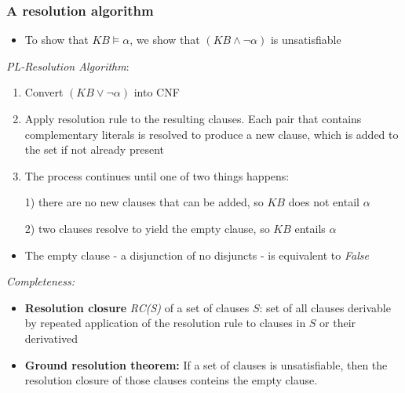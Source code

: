 \documentclass{scrartcl}
\begin{document}
\subsubsection{A resolution algorithm}
\begin{itemize}
    \item
        To show that $KB \vDash \alpha$, we show that $(KB \land \lnot \alpha)$ is unsatisfiable
\end{itemize}
\textit{PL-Resolution Algorithm}:
\begin{enumerate}
    \item
        Convert $(KB \lor \lnot \alpha)$ into CNF
    \item
        Apply resolution rule to the resulting clauses. Each pair that contains complementary literals is resolved to produce a new clause, which is added to the set if not already present
    \item
        The process continues until one of two things happens:

        1) there are no new clauses that can be added, so $KB$ does not entail $\alpha$
        
        2) two clauses resolve to yield the empty clause, so $KB$ entails $\alpha$
\end{enumerate}
\begin{itemize}
    \item
        The empty clause - a disjunction of no disjuncts - is equivalent to \textit{False}
\end{itemize}

\textit{Completeness:}
\begin{itemize}
    \item
        \textbf{Resolution closure }\textit{RC(S)} of a set of clauses $S$: set of all clauses derivable by repeated application of the resolution rule to clauses in $S$ or their derivatived
    \item
        \textbf{Ground resolution theorem:} If a set of clauses is unsatisfiable, then the resolution closure of those clauses conteins the empty clause.
\end{itemize}
\end{document}
